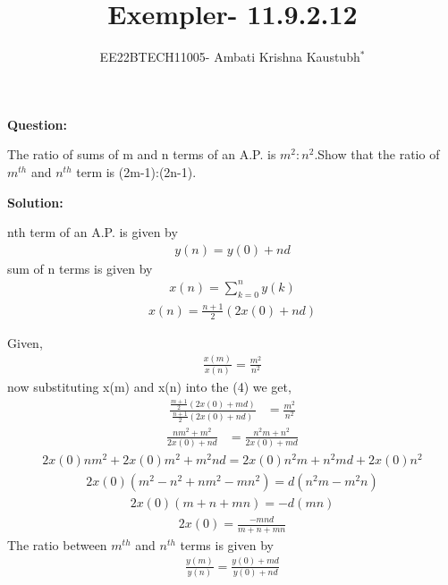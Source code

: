 \documentclass[journal,12pt,twocolumn]{IEEEtran}
\theoremstyle{remark}
\begin{document}

\vspace{3cm}


\title{Exempler- 11.9.2.12}
\author{EE22BTECH11005- Ambati Krishna Kaustubh$^{*}$%
}

\maketitle
\newpage
\bigskip



\textbf{Question:}

The ratio of sums of m and n terms of an A.P. is $m^2:n^2$.Show
that the ratio of $m^{th}$ and $n^{th}$ term is (2m-1):(2n-1).

{\textbf{Solution:}}



nth term of an A.P. is given by 
\begin{align}y(n)=y(0)+nd\end{align}
sum of n terms is given by
\begin{align}
    x(n)=\sum_{k=0}^n y(k)
\end{align}
\begin{align}x(n)=\frac{n+1}{2}(2x(0)+nd)\end{align}

Given,
\begin{align}\frac{x(m)}{x(n)}=\frac{m^2}{n^2} \label{eq:sum} \end{align} 
now substituting x(m) and x(n) into the (4) we get,
\begin{align}\frac{\frac{m+1}{2} {(2x(0)+md)}}{\frac{n+1}{2} {(2x(0)+nd)}}&= 
 \frac{m^2}{n^2}\end{align}
 \begin{align}\frac{nm^2+m^2}{2x(0)+nd}&=\frac{n^2m+n^2}{2x(0)+md}
 \end{align}
 \begin{align}
     2x(0)nm^2+2x(0)m^2+m^2nd
     =2x(0)n^2m+n^2md+2 x(0)n^2
 \end{align}
\begin{align} 2x(0)(m^2-n^2+nm^2-mn^2)=d(n^2m-m^2n)\end{align}
\begin{align}
    2x(0)(m+n+mn)=-d(mn)
\end{align}
\begin{align}
     2x(0)=\frac{-mnd}{m+n+mn}
\end{align}
The ratio between $m^{th}$ and $n^{th}$ terms is given by
 \begin{align}\frac{y(m)}{y(n)}=\frac{y(0)+md}{y(0)+nd}\end{align}
 
\end{document}
